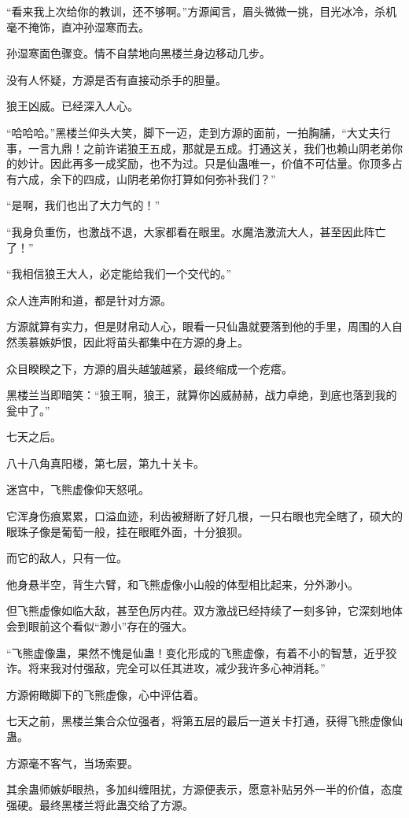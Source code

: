 \begin{this_body}
“看来我上次给你的教训，还不够啊。”方源闻言，眉头微微一挑，目光冰冷，杀机毫不掩饰，直冲孙湿寒而去。

孙湿寒面色骤变。情不自禁地向黑楼兰身边移动几步。

没有人怀疑，方源是否有直接动杀手的胆量。

狼王凶威。已经深入人心。

“哈哈哈。”黑楼兰仰头大笑，脚下一迈，走到方源的面前，一拍胸脯，“大丈夫行事，一言九鼎！之前许诺狼王五成，那就是五成。打通这关，我们也赖山阴老弟你的妙计。因此再多一成奖励，也不为过。只是仙蛊唯一，价值不可估量。你顶多占有六成，余下的四成，山阴老弟你打算如何弥补我们？”

“是啊，我们也出了大力气的！”

“我身负重伤，也激战不退，大家都看在眼里。水魔浩激流大人，甚至因此阵亡了！”

“我相信狼王大人，必定能给我们一个交代的。”

众人连声附和道，都是针对方源。

方源就算有实力，但是财帛动人心，眼看一只仙蛊就要落到他的手里，周围的人自然羡慕嫉妒恨，因此将苗头都集中在方源的身上。

众目睽睽之下，方源的眉头越皱越紧，最终缩成一个疙瘩。

黑楼兰当即暗笑：“狼王啊，狼王，就算你凶威赫赫，战力卓绝，到底也落到我的瓮中了。”

七天之后。

八十八角真阳楼，第七层，第九十关卡。

迷宫中，飞熊虚像仰天怒吼。

它浑身伤痕累累，口溢血迹，利齿被掰断了好几根，一只右眼也完全瞎了，硕大的眼珠子像是葡萄一般，挂在眼眶外面，十分狼狈。

而它的敌人，只有一位。

他身悬半空，背生六臂，和飞熊虚像小山般的体型相比起来，分外渺小。

但飞熊虚像如临大敌，甚至色厉内荏。双方激战已经持续了一刻多钟，它深刻地体会到眼前这个看似“渺小”存在的强大。

“飞熊虚像蛊，果然不愧是仙蛊！变化形成的飞熊虚像，有着不小的智慧，近乎狡诈。将来我对付强敌，完全可以任其进攻，减少我许多心神消耗。”

方源俯瞰脚下的飞熊虚像，心中评估着。

七天之前，黑楼兰集合众位强者，将第五层的最后一道关卡打通，获得飞熊虚像仙蛊。

方源毫不客气，当场索要。

其余蛊师嫉妒眼热，多加纠缠阻扰，方源便表示，愿意补贴另外一半的价值，态度强硬。最终黑楼兰将此蛊交给了方源。


\end{this_body}

